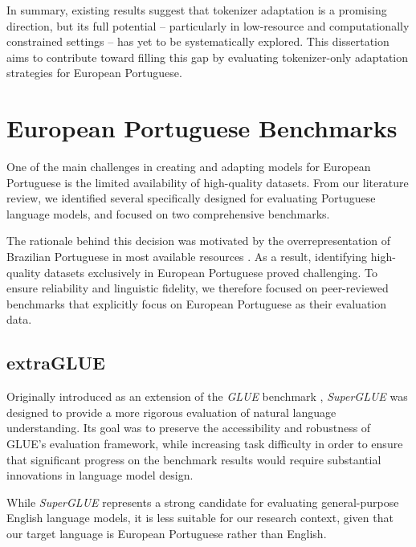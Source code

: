In summary, existing results suggest that tokenizer adaptation is a promising direction, but its full potential -- particularly in low-resource and computationally constrained settings -- has yet to be systematically explored. This dissertation aims to contribute toward filling this gap by evaluating tokenizer-only adaptation strategies for European Portuguese.


\section{European Portuguese Benchmarks}\label{Section3.3}\label{sec:ptpt-benchmarks-intro}
One of the main challenges in creating and adapting models for European Portuguese is the limited availability of high-quality datasets. From our literature review, we identified several specifically designed for evaluating Portuguese language models, and focused on two comprehensive benchmarks.

The rationale behind this decision was motivated by the overrepresentation of Brazilian Portuguese in most available resources \cite{sanches2024brazilian, carvalho2025cam}. 
As a result, identifying high-quality datasets exclusively in European Portuguese proved challenging. To ensure reliability and linguistic fidelity, we therefore focused on peer-reviewed benchmarks that explicitly focus on European Portuguese as their evaluation data.

\subsection{extraGLUE}\label{Section3.3.1}\label{subsec:dataset-extraGLUE}
Originally introduced as an extension of the \emph{GLUE} benchmark \cite{wang2018glue}, \emph{SuperGLUE} was designed to provide a more rigorous evaluation of natural language understanding. Its goal was to preserve the accessibility and robustness of GLUE's evaluation framework, while increasing task difficulty in order to ensure that significant progress on the benchmark results would require substantial innovations in language model design.

While \emph{SuperGLUE} represents a strong candidate for evaluating general-purpose English language models, it is less suitable for our research context, given that our target language is European Portuguese rather than English.

